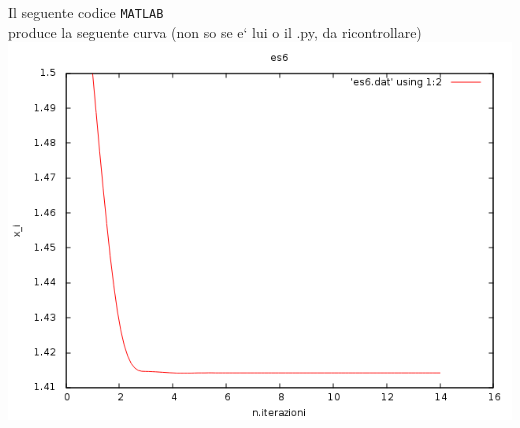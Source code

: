 Il seguente codice \texttt{MATLAB}\\

produce la seguente curva (non so se e` lui o il .py, da ricontrollare)\\
\includegraphics[scale=0.7]{cap_1/es6/es6.png}
